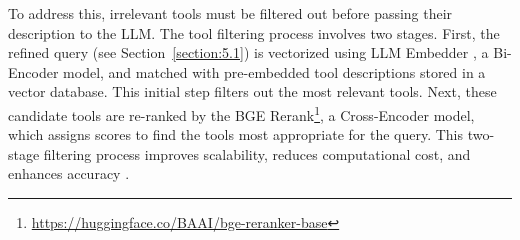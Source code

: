 \documentclass[runningheads]{llncs}
\begin{document}
To address this, irrelevant tools must be filtered out before passing their description to the LLM. The tool filtering process involves two stages. First, the refined query (see Section~\ref{section:5.1}) is vectorized using LLM Embedder \cite{DBLP:journals/corr/abs-2310-07554}, a Bi-Encoder model, and matched with pre-embedded tool descriptions stored in a vector database. This initial step filters out the most relevant tools. Next, these candidate tools are re-ranked by the BGE Rerank\footnote{\url{https://huggingface.co/BAAI/bge-reranker-base}}, a Cross-Encoder model, which assigns scores to find the tools most appropriate for the query. This two-stage filtering process improves scalability, reduces computational cost, and enhances accuracy \cite{10.1145/3404835.3463076}.



%     

\end{document}
